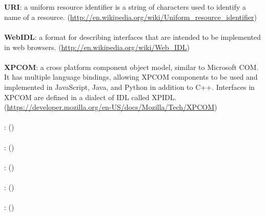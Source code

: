 \documentclass[12pt]{article}
\begin{document}
\\\\
\textbf{URI}: a uniform resource identifier is a string of characters used to identify a name of a resource. (\href{http://en.wikipedia.org/wiki/Uniform_resource_identifier}{http://en.wikipedia.org/wiki/Uniform\_resource\_identifier})
\\\\
\textbf{WebIDL}: a format for describing interfaces that are intended to be implemented in web browsers. (\href{http://en.wikipedia.org/wiki/Web_IDL}{http://en.wikipedia.org/wiki/Web\_IDL})
\\\\
\textbf{XPCOM}: a cross platform component object model, similar to Microsoft COM. It has multiple language bindings, allowing XPCOM components to be used and implemented in JavaScript, Java, and Python in addition to C++. Interfaces in XPCOM are defined in a dialect of IDL called XPIDL. (\href{https://developer.mozilla.org/en-US/docs/Mozilla/Tech/XPCOM}{https://developer.mozilla.org/en-US/docs/Mozilla/Tech/XPCOM})
\\\\
\textbf{}: (\href{}{})
\\\\
\textbf{}: (\href{}{})
\\\\
\textbf{}: (\href{}{})
\\\\
\textbf{}: (\href{}{})
\\\\
\textbf{}: (\href{}{})
\end{document}
